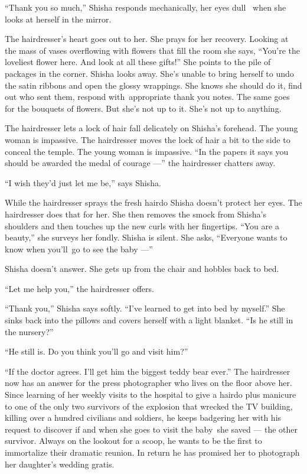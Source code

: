 \documentclass[twoside,11pt,openany]{book}
\begin{document}
``Thank you so much,'' Shisha responds mechanically, her eyes dull ~when she looks at herself
in the mirror.

The hairdresser's heart goes out to her. She prays for her recovery. Looking at the mass of vases overflowing with
flowers that fill the room she says, ``You're the loveliest flower here. And look at all these
gifts!''  She points to the pile of packages in the corner. Shisha looks away. She's unable to bring
herself to undo the satin ribbons and open the glossy wrappings. She knows she should do it, find out who sent them,
respond with~appropriate thank you notes. The same goes for the bouquets of flowers. But she's not up to it.
She's not up to anything.

The hairdresser lets a lock of hair fall delicately on Shisha's forehead. The young woman is impassive. The hairdresser
moves the lock of hair a bit to the side to conceal the temple. The young woman is
impassive.{ }``In the papers it says you should be awarded the
medal of courage ---'' the hairdresser chatters away.

``I wish they'd just let me be,'' says Shisha{.}

While the hairdresser sprays the fresh hairdo Shisha doesn't protect{ }her
eyes. The hairdresser does that for her. She then removes the smock from Shisha's shoulders and then touches up the new
curls with her fingertips. ``You are a beauty,'' she surveys her fondly. Shisha is silent.
She asks, ``Everyone wants to know when you'll~go to see the baby ---''

Shisha doesn't answer. She gets up from the chair and hobbles back to bed.

``Let me help you,'' the hairdresser offers.

``Thank you,'' Shisha says softly. ``I've learned to get into bed by
myself.'' She sinks back into the pillows and covers herself with a light blanket. ``Is he
still in the nursery?''

``He still is. Do you think you'll go and visit him?''

``If the doctor agrees. I'll get him the biggest teddy bear ever.'' The hairdresser now has an
answer for the press photographer who lives on the floor above her. Since learning of her weekly visits to the hospital
to give a hairdo plus manicure to one of the only two survivors of the explosion that wrecked the TV building, killing
over a hundred civilians and soldiers, he keeps badgering her with his request to discover if and when she goes to
visit the baby~she saved --- the other survivor.
Always on the lookout for a scoop, he wants to be the first to
immortalize their dramatic reunion. In return he has promised her to photograph her daughter's wedding gratis.
\end{document}
